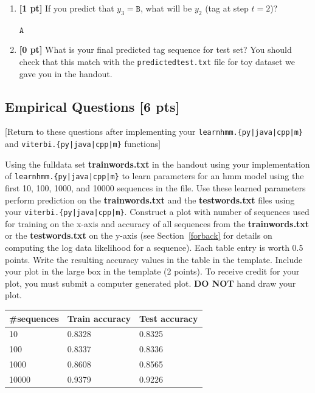 \documentclass{article}
\begin{document}
\begin{enumerate}
    \item \textbf{[1 pt]} If you predict that $y_3 = \texttt{B}$, what will be $y_2$ (tag at step $t = 2$)?
    
    \begin{tcolorbox}[fit,height=1cm, width=2cm, blank, borderline={1pt}{-2pt}]
            \begin{center}\huge$\texttt{A}$\end{center}
        \end{tcolorbox}
    
    \item \textbf{[0 pt]} What is your final predicted tag sequence for test set? You should check that this match with the \texttt{predictedtest.txt} file for toy dataset we gave you in the handout.
    
\end{enumerate}

\clearpage

\subsection{Empirical Questions [6 pts]}
[Return to these questions after implementing your \texttt{learnhmm.\{py|java|cpp|m\}} and \texttt{viterbi.\{py|java|cpp|m\}} functions]

Using the fulldata set \textbf{trainwords.txt} in the handout using your implementation of \texttt{learnhmm.\{py|java|cpp|m\}} to learn parameters for an hmm model using the first 10, 100, 1000, and 10000 sequences in the file.
Use these learned parameters perform prediction on the \textbf{trainwords.txt} and the \textbf{testwords.txt} files using your \texttt{viterbi.\{py|java|cpp|m\}}.
Construct a plot with number of sequences used for training on the x-axis and accuracy of all sequences from the \textbf{trainwords.txt} or the \textbf{testwords.txt} on the y-axis (see Section~\ref{forback} for details on computing the log data likelihood for a sequence). Each table entry is worth 0.5 points. 
Write the resulting accuracy values in the table in the template.
Include your plot in the large box in the template (2 points).
To receive credit for your plot, you must submit a computer generated plot.
\textbf{DO NOT} hand draw your plot.

\begin{table}[h]
    \center
    \begin{tabular}{|m{2cm}|m{3cm}|m{3cm}|}
    \hline
    \#sequences & Train accuracy & Test accuracy \\ \hline
    10         &  0.8328  & 0.8325 \\ \hline
    100        &  0.8337  & 0.8336 \\ \hline
    1000       &  0.8608  & 0.8565 \\ \hline
    10000      &  0.9379  & 0.9226 \\ \hline
    \end{tabular}
    \end{table}
\end{document}
